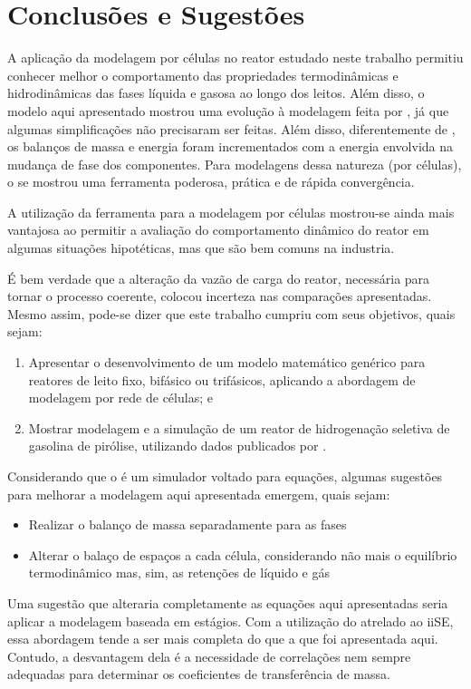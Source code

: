 %
% 
%
\chapter{Conclusões e Sugestões} \label{chap:conclusoes}
% 
A aplicação da modelagem por células no reator estudado neste trabalho permitiu
conhecer melhor o comportamento das propriedades termodinâmicas e hidrodinâmicas
das fases líquida e gasosa ao longo dos leitos. Além disso, o modelo aqui
apresentado mostrou uma evolução à modelagem feita por ,
já que algumas simplificações não precisaram ser feitas. Além disso,
diferentemente de , os balanços de massa e energia foram
incrementados com a energia envolvida na mudança de fase dos componentes. Para
modelagens dessa natureza (por células), o \emso se mostrou uma ferramenta
poderosa, prática e de rápida convergência.

A utilização da ferramenta \emso para a modelagem por células mostrou-se
ainda mais vantajosa ao permitir a avaliação do comportamento dinâmico do reator
em algumas situações hipotéticas, mas que são bem comuns na industria.

É bem verdade que a alteração da vazão de carga do reator, necessária para
tornar o processo coerente, colocou incerteza nas comparações apresentadas.
Mesmo assim, pode-se dizer que este trabalho cumpriu com seus objetivos,
quais sejam:

\begin{enumerate}
  \item Apresentar o desenvolvimento de um modelo matemático genérico para
  reatores de leito fixo, bifásico ou trifásicos, aplicando a abordagem de
  modelagem por rede de células; e 
  \item Mostrar modelagem e a simulação de um reator de hidrogenação seletiva
  de gasolina de pirólise, utilizando dados publicados por
  .
\end{enumerate}

Considerando que o \emso é um simulador voltado para equações, algumas
sugestões para melhorar a modelagem aqui apresentada emergem, quais sejam:

\begin{itemize}
\item {Realizar o balanço de massa separadamente para as fases}
\item {Alterar o balaço de espaços a cada célula, considerando não mais o
equilíbrio termodinâmico mas, sim, as retenções de líquido e gás}
\end{itemize}

Uma sugestão que alteraria completamente as equações aqui apresentadas seria
aplicar a modelagem baseada em estágios. Com a utilização do \emso atrelado ao
iiSE, essa abordagem tende a ser mais completa do que a que foi apresentada
aqui. Contudo, a desvantagem dela é a necessidade de correlações nem sempre
adequadas para determinar os coeficientes de transferência de massa.